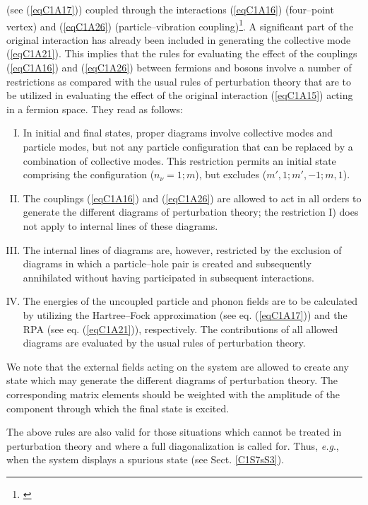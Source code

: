 (see (\ref{eqC1A17})) coupled through the interactions (\ref{eqC1A16}) (four--point vertex) and (\ref{eqC1A26}) (particle--vibration coupling)\footnote{\cite{Bes:74,Broglia:76}}. A significant
part of the original interaction has already been included in generating the
collective mode (\ref{eqC1A21}). This implies that the rules for evaluating the effect of
the couplings (\ref{eqC1A16}) and (\ref{eqC1A26}) between fermions and bosons involve a number of restrictions as compared with the usual rules of perturbation theory that
are to be utilized in evaluating the effect of the original interaction (\ref{eqC1A15}) acting
in a fermion space. They read as follows:
\begin{enumerate}[I)]
\item In initial and final states, proper diagrams involve collective modes
and particle modes, but not any particle configuration that can be replaced by
a combination of collective modes. This restriction permits an initial state
comprising the configuration ($n_\nu =1;m$), but excludes ($m', 1; m',-1; m,1$).
\item The couplings (\ref{eqC1A16}) and (\ref{eqC1A26}) are allowed to act in all orders to
generate the different diagrams of perturbation theory; the restriction I) does
not apply to internal lines of these diagrams.
\item The internal lines of diagrams are, however, restricted by the exclusion of diagrams in which a particle--hole pair is created and subsequently
annihilated without having participated in subsequent interactions.
\item The energies of the uncoupled particle and phonon fields are to be
calculated by utilizing the Hartree--Fock approximation (see eq. (\ref{eqC1A17})) and the
RPA (see eq. (\ref{eqC1A21})), respectively. The contributions of all allowed diagrams are
evaluated by the usual rules of perturbation theory.
\end{enumerate}

We note that the external fields acting on the system are allowed to create
any state which may generate the different diagrams of perturbation theory.
The corresponding matrix elements should be weighted with the amplitude of
the component through which the final state is excited.



The above rules are also valid for those situations which cannot be treated
in perturbation theory and where a full diagonalization is called for. Thus,
\textit{e.g}., when the system displays a spurious state (see Sect. \ref{C1S7sS3}).



